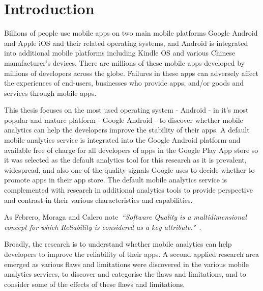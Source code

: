 \chapter{Introduction}

Billions of people use mobile apps on two main mobile platforms Google Android and Apple iOS and their related operating systems, and Android is integrated into additional mobile platforms including Kindle OS and various Chinese manufacturer's devices. There are millions of these mobile apps developed by millions of developers across the globe. Failures in these apps can adversely affect the experiences of end-users, businesses who provide apps, and/or goods and services through mobile apps. 

This thesis focuses on the most used operating system - Android - in it's most popular and mature platform - Google Android - to discover whether mobile analytics can help the developers improve the stability of their apps. A default mobile analytics service is integrated into the Google Android platform and available free of charge for all developers of apps in the Google Play App store so it was selected as the default analytics tool for this research as it is prevalent, widespread, and also one of the quality signals Google uses to decide whether to promote apps in their app store. The default mobile analytics service is complemented with research in additional analytics tools to provide perspective and contrast in their various characteristics and capabilities.


As Febrero, Moraga and Calero note~\emph{``Software Quality is a multidimensional concept for which Reliability is considered as a key attribute."}~\citep{febrero2017_software_reliability_as_user_perception}.

Broadly, the research is to understand whether mobile analytics can help developers to improve the reliability of their apps. A second applied research area emerged as various flaws and limitations were discovered in the various mobile analytics services, to discover and categorise the flaws and limitations, and to consider some of the effects of these flaws and limitations. 

